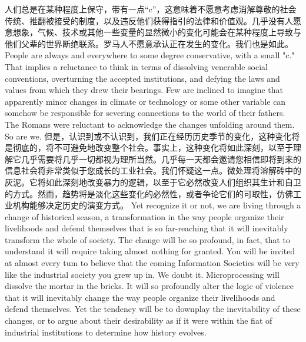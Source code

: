 \begin{paracol}{2}
  \switchcolumn*
  人们总是在某种程度上保守，带有一点“c”，这意味着不愿意考虑消解尊敬的社会传统、推翻被接受的制度，以及违反他们获得指引的法律和价值观。几乎没有人愿意想象，气候、技术或其他一些变量的显然微小的变化可能会在某种程度上导致与他们父辈的世界断绝联系。罗马人不愿意承认正在发生的变化。我们也是如此。
  \switchcolumn
  People are always and everywhere to some degree conservative, with a small "c." That implies a reluctance to think in terms of dissolving venerable social conventions, overturning the accepted institutions, and defying the laws and values from which they drew their bearings. Few are inclined to imagine that apparently minor changes in climate or technology or some other variable can somehow be responsible for severing connections to the world of their fathers. The Romans were reluctant to acknowledge the changes unfolding around them. So are we.
  \switchcolumn*
  但是，认识到或不认识到，我们正在经历历史季节的变化，这种变化将是彻底的，将不可避免地改变整个社会。事实上，这种变化将如此深刻，以至于理解它几乎需要将几乎一切都视为理所当然。几乎每一天都会邀请您相信即将到来的信息社会将非常类似于您成长的工业社会。我们怀疑这一点。微处理将溶解砖中的灰泥。它将如此深刻地改变暴力的逻辑，以至于它必然改变人们组织其生计和自卫的方式。然而，趋势将是淡化这些变化的必然性，或者争论它们的可取性，仿佛工业机构能够决定历史的演变方式。
  \switchcolumn
  Yet recognize it or not, we are living through a change of historical season, a transformation in the way people organize their livelihoods and defend themselves that is so far-reaching that it will inevitably transform the whole of society. The change will be so profound, in fact, that to understand it will require taking almost nothing for granted. You will be invited at almost every tum to believe that the coming Information Societies will be very like the industrial society you grew up in. We doubt it. Microprocessing will dissolve the mortar in the bricks. It will so profoundly alter the logic of violence that it will inevitably change the way people organize their livelihoods and defend themselves. Yet the tendency will be to downplay the inevitability of these changes, or to argue about their desirability as if it were within the fiat of industrial institutions to determine how history evolves.

  \end{paracol}

